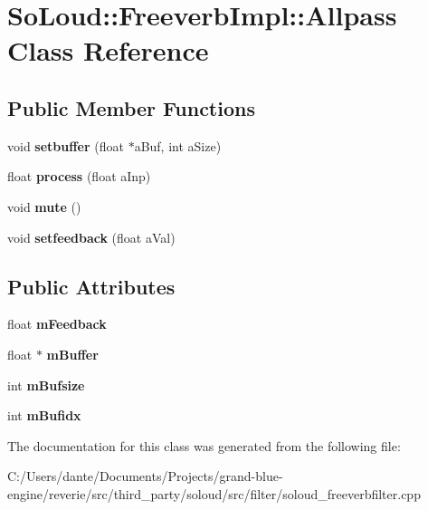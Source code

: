 \hypertarget{class_so_loud_1_1_freeverb_impl_1_1_allpass}{}\section{So\+Loud\+::Freeverb\+Impl\+::Allpass Class Reference}
\label{class_so_loud_1_1_freeverb_impl_1_1_allpass}
\subsection*{Public Member Functions}
\begin{DoxyCompactItemize}
\item 
\mbox{\label{class_so_loud_1_1_freeverb_impl_1_1_allpass_ac70dfb2751a2b8625515db9e45af5d14}} 
void {\bfseries setbuffer} (float $\ast$a\+Buf, int a\+Size)
\item 
\mbox{\label{class_so_loud_1_1_freeverb_impl_1_1_allpass_a2719d766b8b3df75a7fca594f2fe98de}} 
float {\bfseries process} (float a\+Inp)
\item 
\mbox{\label{class_so_loud_1_1_freeverb_impl_1_1_allpass_a90053938f25a46c4abdd78142878c059}} 
void {\bfseries mute} ()
\item 
\mbox{\label{class_so_loud_1_1_freeverb_impl_1_1_allpass_a523394a7ff5177fddf86e9757b84a816}} 
void {\bfseries setfeedback} (float a\+Val)
\end{DoxyCompactItemize}
\subsection*{Public Attributes}
\begin{DoxyCompactItemize}
\item 
\mbox{\label{class_so_loud_1_1_freeverb_impl_1_1_allpass_a3e137d870c24e886b0cd8b60ff67ec25}} 
float {\bfseries m\+Feedback}
\item 
\mbox{\label{class_so_loud_1_1_freeverb_impl_1_1_allpass_ac519ce1c3926f5a61868463e230a2f5f}} 
float $\ast$ {\bfseries m\+Buffer}
\item 
\mbox{\label{class_so_loud_1_1_freeverb_impl_1_1_allpass_ab8d277645e8e8806d214ae22e9209fe1}} 
int {\bfseries m\+Bufsize}
\item 
\mbox{\label{class_so_loud_1_1_freeverb_impl_1_1_allpass_a9afc9b46379f3189df313528f0af0224}} 
int {\bfseries m\+Bufidx}
\end{DoxyCompactItemize}


The documentation for this class was generated from the following file\+:\begin{DoxyCompactItemize}
\item 
C\+:/\+Users/dante/\+Documents/\+Projects/grand-\/blue-\/engine/reverie/src/third\+\_\+party/soloud/src/filter/soloud\+\_\+freeverbfilter.\+cpp\end{DoxyCompactItemize}
